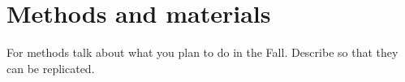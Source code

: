 \section{Methods and materials}
For methods talk about what you plan to do in the Fall. Describe so that they can be replicated. 

